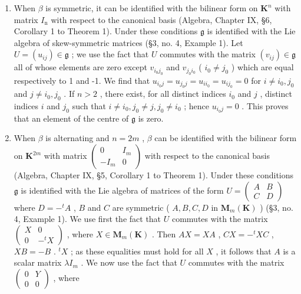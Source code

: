 \begin{enumerate}
\def\labelenumi{(\alph{enumi})}
\item
  When \(\beta\) is symmetric, it can be identified with the bilinear form on \(\mathbf{K}^n\) with matrix \(I_{\mathrm{n}}\) with respect to the canonical basis (Algebra, Chapter IX, §6, Corollary 1 to Theorem 1). Under these conditions \(\mathfrak{g}\) is identified with the Lie algebra of skew-symmetric matrices (§3, no. 4, Example 1). Let \(U = (u_{ij}) \in \mathfrak{g}\) ; we use the fact that \(U\) commutes with the matrix \((v_{ij}) \in \mathfrak{g}\) all of whose elements are zero except \(v_{i_0j_0}\) and \(v_{j_0i_0}\) ( \(i_0 \neq j_0\) ) which are equal respectively to 1 and -1. We find that \(u_{i_0j} = u_{j_0j} = u_{ii_0} = u_{ij_0} = 0\) for \(i \neq i_0, j_0\) and \(j \neq i_0, j_0\) . If \(n > 2\) , there exist, for all distinct indices \(i_0\) and \(j\) , distinct indices \(i\) and \(j_0\) such that \(i \neq i_0, j_0 \neq j, j_0 \neq i_0\) ; hence \(u_{i_0j} = 0\) . This proves that an element of the centre of \(\mathfrak{g}\) is zero.
\item
  When \(\beta\) is alternating and \(n = 2m\) , \(\beta\) can be identified with the bilinear form on \(\mathbf{K}^{2m}\) with matrix \(\left( \begin{array}{cc}0 & I_m \\ -I_m & 0 \end{array} \right)\) with respect to the canonical basis (Algebra, Chapter IX, §5, Corollary 1 to Theorem 1). Under these conditions \(\mathfrak{g}\) is identified with the Lie algebra of matrices of the form \(U = \left( \begin{array}{cc}A & B\\ C & D \end{array} \right)\) where \(D = -^t A\) , \(B\) and \(C\) are symmetric ( \(A, B, C, D\) in \(\mathbf{M}_m(\mathbf{K})\) ) (§3, no. 4, Example 1). We use first the fact that \(U\) commutes with the matrix \(\left( \begin{array}{cc}X & 0 \\ 0 & -^t X \end{array} \right)\) , where \(X \in \mathbf{M}_m(\mathbf{K})\) . Then \(AX = X A\) , \(CX = -^t XC\) , \(XB = -B\) . \(^t X\) ; as these equalities must hold for all \(X\) , it follows that \(A\) is a scalar matrix \(\lambda I_m\) . We now use the fact that \(U\) commutes with the matrix \(\left( \begin{array}{cc}0 & Y \\ 0 & 0 \end{array} \right)\) , where
\end{enumerate}

